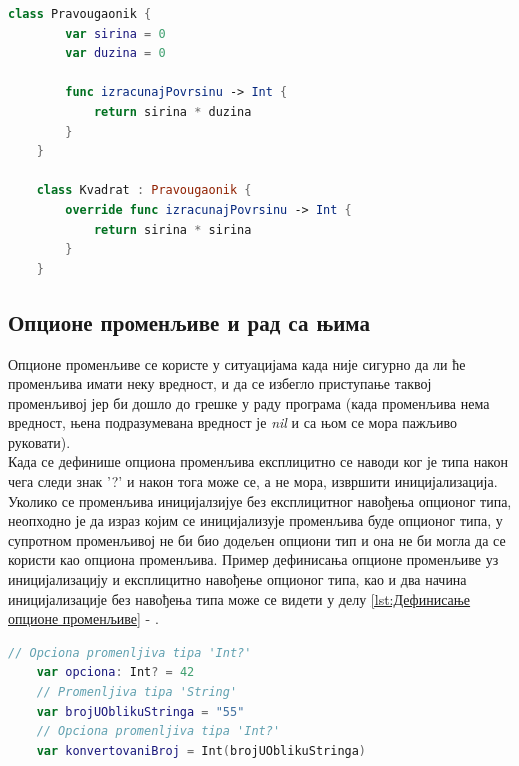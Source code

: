 \documentclass[12pt,oneside]{memoir}
\begin{document}
\begin{lstlisting}[caption=\textit{{Наслеђивање класа}}, label={lst:Наслеђивање класа}, language=Swift, frame=single]
    class Pravougaonik {
        var sirina = 0
        var duzina = 0
        
        func izracunajPovrsinu -> Int {
            return sirina * duzina
        }
    }
    
    class Kvadrat : Pravougaonik {
        override func izracunajPovrsinu -> Int {
            return sirina * sirina
        }
    }
\end{lstlisting}

\subsection{Опционе променљиве и рад са њима}

\indent Опционе променљиве се користе у ситуацијама када није сигурно да ли ће променљива имати неку вредност, и да се избегло приступање таквој променљивој јер би дошло до грешке у раду програма (када променљива нема вредност, њена подразумевана вредност је \textit{nil} и са њом се мора пажљиво руковати).
\\
\indent Када се дефинише опциона променљива експлицитно се наводи ког је типа након чега следи знак '?' и након тога може се, а не мора, извршити иницијализација. Уколико се променљива иницијалзијуе без експлицитног навођења опционог типа, неопходно је да израз којим се иницијализује променљива буде опционог типа, у супротном променљивој не би био додељен опциони тип и она не би могла да се користи као опциона променљива. Пример дефинисања опционе променљиве уз иницијализацију и експлицитно навођење опционог типа, као и два начина иницијализације без навођења типа може се видети у делу \ref{lst:Дефинисање опционе променљиве} - .

\begin{lstlisting}[caption=\textit{{Дефинисање опционе променљиве}}, label={lst:Дефинисање опционе променљиве}, language=Swift, frame=single]
    // Opciona promenljiva tipa 'Int?'
    var opciona: Int? = 42
    // Promenljiva tipa 'String'
    var brojUOblikuStringa = "55"
    // Opciona promenljiva tipa 'Int?'
    var konvertovaniBroj = Int(brojUOblikuStringa)
\end{lstlisting}
\end{document}
